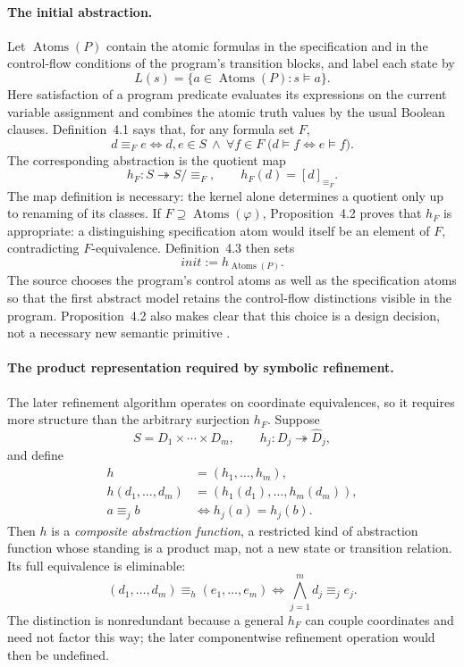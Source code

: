 \paragraph{The initial abstraction.}
Let \(\operatorname{Atoms}(P)\) contain the atomic formulas in the
specification and in the control-flow conditions of the program's transition
blocks, and label each state by
\[
 L(s)=\{a\in\operatorname{Atoms}(P):s\models a\}.
\]
Here satisfaction of a program predicate evaluates its expressions on the
current variable assignment and combines the atomic truth values by the
usual Boolean clauses. Definition~4.1 says that, for any formula set \(F\),
\[
 d\equiv_F e
 \iff
 d,e\in S\ \land\
 \forall f\in F\;\bigl(d\models f\iff e\models f\bigr).
\]
The corresponding abstraction is the quotient map
\[
 h_F:S\twoheadrightarrow S/{\equiv_F},
 \qquad
 h_F(d)=[d]_{\equiv_F}.
\]
The map definition is necessary: the kernel alone determines a quotient only
up to renaming of its classes.  If
\(F\supseteq\operatorname{Atoms}(\varphi)\), Proposition~4.2 proves that
\(h_F\) is appropriate: a distinguishing specification atom would itself be
an element of \(F\), contradicting \(F\)-equivalence.  Definition~4.3 then
sets
\[
 init:=h_{\operatorname{Atoms}(P)}.
\]
The source chooses the program's control atoms as well as the specification
atoms so that the first abstract model retains the control-flow distinctions
visible in the program.  Proposition~4.2 also makes clear that this choice is a
design decision, not a necessary new semantic primitive
\cite[defs.~4.1, 4.3 and prop.~4.2; pp.~768--769]{ClarkeEtAl2003}.

\paragraph{The product representation required by symbolic refinement.}
The later refinement algorithm operates on coordinate equivalences, so it
requires more structure than the arbitrary surjection \(h_F\).  Suppose
\[
 S=D_1\times\cdots\times D_m,\qquad
 h_j:D_j\twoheadrightarrow\widehat D_j,
\]
and define
\[
\begin{aligned}
 h&=(h_1,\ldots,h_m),\\
 h(d_1,\ldots,d_m)
   &=(h_1(d_1),\ldots,h_m(d_m)),\\
 a\equiv_j b&\iff h_j(a)=h_j(b).
\end{aligned}
\]
Then \(h\) is a \emph{composite abstraction function}, a restricted kind of
abstraction function whose standing is a product map, not a new state or
transition relation.  Its full equivalence is eliminable:
\[
 (d_1,\ldots,d_m)\equiv_h(e_1,\ldots,e_m)
 \iff
 \bigwedge_{j=1}^{m}d_j\equiv_j e_j.
\]
The distinction is nonredundant because a general \(h_F\) can couple
coordinates and need not factor this way; the later componentwise refinement
operation would then be undefined.

